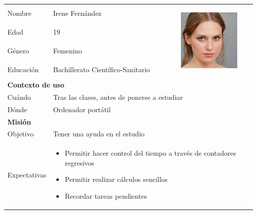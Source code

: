 \begin{table}[H]
	\centering
	\begin{tabular}{|l|l|l|} 
		\hline
		Nombre       & Irene Fernández & \multirow{4}{*}{
			\begin{minipage}[t]{0.4\textwidth}
				\begin{center}
					 \includegraphics[height=3cm]{imagenes/Persona1.jpg}
				\end{center}
			\end{minipage}
			}                 \\ [2ex]
		\cline{1-2}
		Edad         & 19 &                                   \\ [2ex] 
		\cline{1-2}
		Género         & Femenino &                                   \\ [2ex]
		\cline{1-2}
		Educación    & Bachillerato Científico-Sanitario &                                   \\ [2ex] 
		\hline
		\multicolumn{3}{|l|}{{\cellcolor{lightblue}}\textbf{Contexto de uso}}               \\ 
		\hline
		Cuándo       & \multicolumn{2}{l|}{Tras las clases, antes de ponerse a estudiar}                \\ 
		\hline
		Dónde        & \multicolumn{2}{l|}{Ordenador portátil}                \\ 
		\hline
		\multicolumn{3}{|l|}{{\cellcolor{lightblue}}\textbf{Misión}}                        \\ 
		\hline
		Objetivo     & \multicolumn{2}{l|}{Tener una ayuda en el estudio}                \\ 
		\hline
		Expectativas & \multicolumn{2}{l|}{
			\begin{minipage} [t] {0.7\textwidth}
				\begin{itemize}
					\item Permitir hacer control del tiempo a través de contadores regresivos
					\item Permitir realizar cálculos sencillos
					\item Recordar tareas pendientes
				\end{itemize}
			\end{minipage}
		}                \\ 

\end{tabular}
\end{table}
